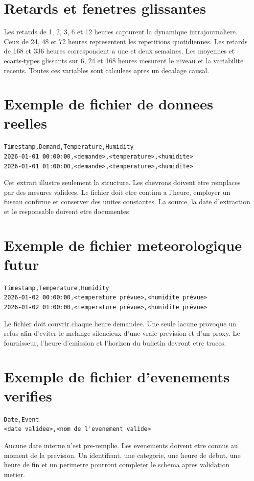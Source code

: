 \clearpage
\section{Retards et fenetres glissantes}
Les retards de 1, 2, 3, 6 et 12 heures capturent la dynamique intrajournaliere. Ceux de 24, 48 et 72 heures representent les repetitions quotidiennes. Les retards de 168 et 336 heures correspondent a une et deux semaines. Les moyennes et ecarts-types glissants sur 6, 24 et 168 heures mesurent le niveau et la variabilite recents. Toutes ces variables sont calculees apres un decalage causal.

\clearpage
\section{Exemple de fichier de donnees reelles}
\begin{verbatim}
Timestamp,Demand,Temperature,Humidity
2026-01-01 00:00:00,<demande>,<temperature>,<humidite>
2026-01-01 01:00:00,<demande>,<temperature>,<humidite>
\end{verbatim}
Cet extrait illustre seulement la structure. Les chevrons doivent etre remplaces par des mesures validees. Le fichier doit etre continu a l'heure, employer un fuseau confirme et conserver des unites constantes. La source, la date d'extraction et le responsable doivent etre documentes.

\clearpage
\section{Exemple de fichier meteorologique futur}
\begin{verbatim}
Timestamp,Temperature,Humidity
2026-01-02 00:00:00,<temperature prévue>,<humidite prévue>
2026-01-02 01:00:00,<temperature prévue>,<humidite prévue>
\end{verbatim}
Le fichier doit couvrir chaque heure demandee. Une seule lacune provoque un refus afin d'eviter le melange silencieux d'une vraie prevision et d'un proxy. Le fournisseur, l'heure d'emission et l'horizon du bulletin devront etre traces.

\clearpage
\section{Exemple de fichier d'evenements verifies}
\begin{verbatim}
Date,Event
<date validee>,<nom de l'evenement valide>
\end{verbatim}
Aucune date interne n'est pre-remplie. Les evenements doivent etre connus au moment de la prevision. Un identifiant, une categorie, une heure de debut, une heure de fin et un perimetre pourront completer le schema apres validation metier.

